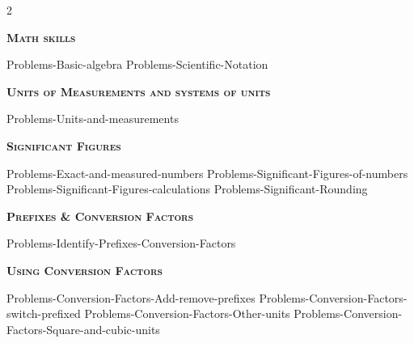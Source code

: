 \documentclass[main.tex]{subfiles}
\begin{document}
\newpage\newcommand\chapterlabel{Ch-measurements}\renewcommand{\bondwidth}{0.06642 em}  



\fancyhfoffset[E,O]{0pt}
\setlength{\columnsep}{30pt}
\begin{conclusion}
\iftoggle{chem121}{}{\setcounter{chapter}{1}}
\iftoggle{chem121}{\setcounter{chapter}{1}}{}
\end{conclusion}
\begin{multicols*}{2}\setcounter{numA}{1}  %


{\raggedright\textsc{\textbf{Math skills }}\par}
{Problems-Basic-algebra}
{Problems-Scientific-Notation}

{\raggedright\textsc{\textbf{Units of Measurements and systems of units }}\par}
{Problems-Units-and-measurements}

{\raggedright\textsc{\textbf{Significant Figures }}\par}
{Problems-Exact-and-measured-numbers}
 {Problems-Significant-Figures-of-numbers}
{Problems-Significant-Figures-calculations}
{Problems-Significant-Rounding}



{\raggedright\textsc{\textbf{Prefixes \& Conversion Factors }}\par}
{Problems-Identify-Prefixes-Conversion-Factors}


%
%
{\raggedright\textsc{\textbf{Using Conversion Factors }}\par}
{Problems-Conversion-Factors-Add-remove-prefixes}
{Problems-Conversion-Factors-switch-prefixed}
{Problems-Conversion-Factors-Other-units}
{Problems-Conversion-Factors-Square-and-cubic-units}



\end{multicols*}
\end{document}
